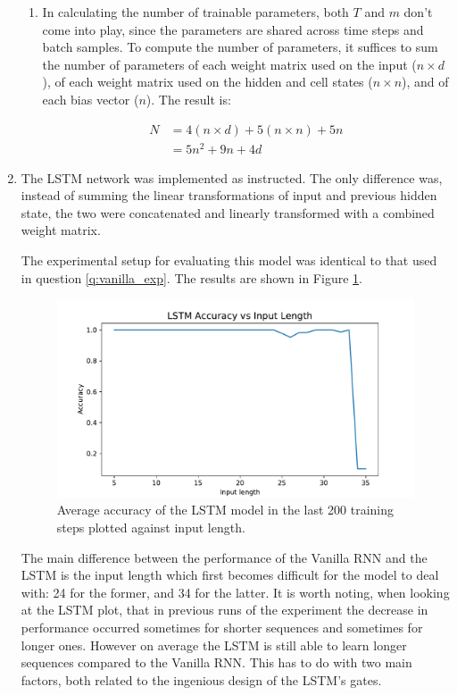 \documentclass{article}
\begin{document}
\begin{enumerate}[label=\textbf{1.\arabic*}]
\begin{enumerate}[label=\textbf{(\alph*)}]
    \item
    In calculating the number of trainable parameters, both $T$ and $m$ don't come into play, since the parameters are shared across time steps and batch samples. To compute the number of parameters, it suffices to sum the number of parameters of each weight matrix used on the input ($n \times d$), of each weight matrix used on the hidden and cell states ($n \times n$), and of each bias vector ($n$). The result is:

    \begin{align*}
      N &= 4 (n \times d) + 5 (n \times n) + 5 n \\
      &= 5n^2 + 9n + 4d
    \end{align*}

  \end{enumerate}

  \item
  The LSTM network was implemented as instructed. The only difference was, instead of summing the linear transformations of input and previous hidden state, the two were concatenated and linearly transformed with a combined weight matrix.

  The experimental setup for evaluating this model was identical to that used in question \ref{q:vanilla_exp}. The results are shown in Figure \ref{fig:results_lstm}.

  \begin{figure}[ht]
      \centering
      \includegraphics[scale=0.6]{img/results_LSTM.pdf}
      \caption{Average accuracy of the LSTM model in the last 200 training steps plotted against input length.}
      \label{fig:results_lstm}
  \end{figure}

  The main difference between the performance of the Vanilla RNN and the LSTM is the input length which first becomes difficult for the model to deal with: 24 for the former, and 34 for the latter. It is worth noting, when looking at the LSTM plot, that in previous runs of the experiment the decrease in performance occurred sometimes for shorter sequences and sometimes for longer ones. However on average the LSTM is still able to learn longer sequences compared to the Vanilla RNN. This has to do with two main factors, both related to the ingenious design of the LSTM's gates.


\end{enumerate}
\end{document}
